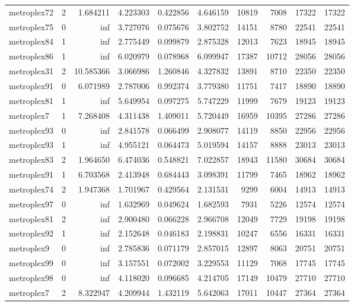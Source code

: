 \begin{longtable}{|l|r|r|r|r|r|r|r|r|r|}
metroplex72 & 2 & 1.684211 & 4.223303 & 0.422856 & 4.646159 & 10819 & 7008 & 17322 & 17322 \\
metroplex75 & 0 & inf & 3.727076 & 0.075676 & 3.802752 & 14151 & 8780 & 22541 & 22541 \\
metroplex84 & 1 & inf & 2.775449 & 0.099879 & 2.875328 & 12013 & 7623 & 18945 & 18945 \\
metroplex86 & 1 & inf & 6.020979 & 0.078968 & 6.099947 & 17387 & 10712 & 28056 & 28056 \\
metroplex31 & 2 & 10.585366 & 3.066986 & 1.260846 & 4.327832 & 13891 & 8710 & 22350 & 22350 \\
metroplex91 & 0 & 6.071989 & 2.787006 & 0.992374 & 3.779380 & 11751 & 7417 & 18890 & 18890 \\
metroplex81 & 1 & inf & 5.649954 & 0.097275 & 5.747229 & 11999 & 7679 & 19123 & 19123 \\
metroplex7 & 1 & 7.268408 & 4.311438 & 1.409011 & 5.720449 & 16959 & 10395 & 27286 & 27286 \\
metroplex93 & 0 & inf & 2.841578 & 0.066499 & 2.908077 & 14119 & 8850 & 22956 & 22956 \\
metroplex93 & 1 & inf & 4.955121 & 0.064473 & 5.019594 & 14157 & 8888 & 23013 & 23013 \\
metroplex83 & 2 & 1.964650 & 6.474036 & 0.548821 & 7.022857 & 18943 & 11580 & 30684 & 30684 \\
metroplex91 & 1 & 6.703568 & 2.413948 & 0.684443 & 3.098391 & 11799 & 7465 & 18962 & 18962 \\
metroplex74 & 2 & 1.947368 & 1.701967 & 0.429564 & 2.131531 & 9299 & 6004 & 14913 & 14913 \\
metroplex97 & 0 & inf & 1.632969 & 0.049624 & 1.682593 & 7931 & 5226 & 12574 & 12574 \\
metroplex81 & 2 & inf & 2.900480 & 0.066228 & 2.966708 & 12049 & 7729 & 19198 & 19198 \\
metroplex92 & 1 & inf & 2.152648 & 0.046183 & 2.198831 & 10247 & 6556 & 16331 & 16331 \\
metroplex9 & 0 & inf & 2.785836 & 0.071179 & 2.857015 & 12897 & 8063 & 20751 & 20751 \\
metroplex99 & 0 & inf & 3.157551 & 0.072002 & 3.229553 & 11129 & 7068 & 17745 & 17745 \\
metroplex98 & 0 & inf & 4.118020 & 0.096685 & 4.214705 & 17149 & 10479 & 27710 & 27710 \\
metroplex7 & 2 & 8.322947 & 4.209944 & 1.432119 & 5.642063 & 17011 & 10447 & 27364 & 27364 \\

\end{longtable}
